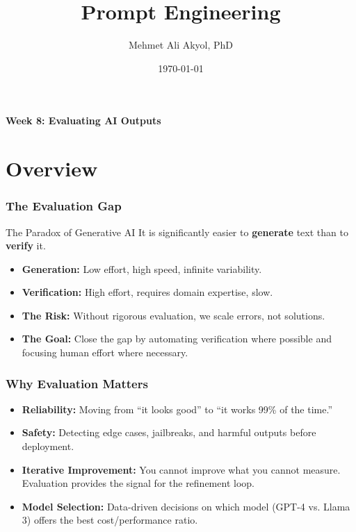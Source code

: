 \documentclass{beamer}
\title{Prompt Engineering}
\author{Mehmet Ali Akyol, PhD}
\institute{Ankara Medipol University}
\date{\today}
\begin{document}
\begin{frame}
    \titlepage
    \begin{center}
        \vspace{1cm}
        \textbf{Week 8: Evaluating AI Outputs}
    \end{center}
\end{frame}

\section{Overview}

\begin{frame}
    \frametitle{The Evaluation Gap}
    \begin{block}{The Paradox of Generative AI}
        It is significantly easier to \textbf{generate} text than to \textbf{verify} it.
    \end{block}
    \begin{itemize}
        \item \textbf{Generation:} Low effort, high speed, infinite variability.
        \item \textbf{Verification:} High effort, requires domain expertise, slow.
        \item \textbf{The Risk:} Without rigorous evaluation, we scale errors, not solutions.
        \item \textbf{The Goal:} Close the gap by automating verification where possible and focusing human effort where necessary.
    \end{itemize}
\end{frame}

\begin{frame}
    \frametitle{Why Evaluation Matters}
    \begin{itemize}
        \item \textbf{Reliability:} Moving from ``it looks good'' to ``it works 99\% of the time.''
        \item \textbf{Safety:} Detecting edge cases, jailbreaks, and harmful outputs before deployment.
        \item \textbf{Iterative Improvement:} You cannot improve what you cannot measure. Evaluation provides the signal for the refinement loop.
        \item \textbf{Model Selection:} Data-driven decisions on which model (GPT-4 vs. Llama 3) offers the best cost/performance ratio.
    \end{itemize}
\end{frame}
\end{document}
